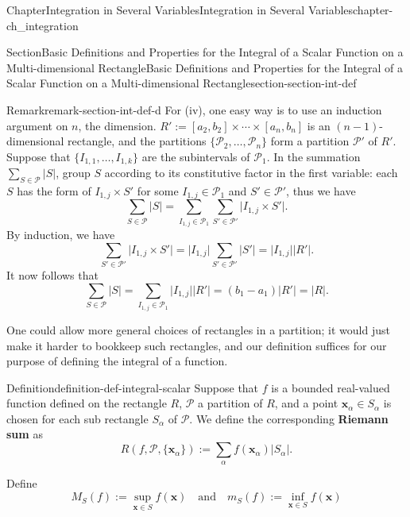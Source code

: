 \documentclass[oneside,10pt,]{book}
\newcommand{\terminology}[1]{\textbf{#1}}
\numberwithin{equation}{section}
\newcommand{\bx}{\mathbf{x}}
\newcommand{\cP}{\mathcal{P}}
\begin{document}
\begin{chapterptx}{Chapter}{Integration in Several Variables}{}{Integration in Several Variables}{}{}{chapter-ch_integration}
\begin{sectionptx}{Section}{Basic Definitions and Properties for the Integral of a Scalar Function on a Multi-dimensional Rectangle}{}{Basic Definitions and Properties for the Integral of a Scalar Function on a Multi-dimensional Rectangle}{}{}{section-section-int-def}
\begin{remark}{Remark}{}{remark-section-int-def-d}
For (iv), one easy way is to use an induction argument on \(n\), the dimension. \(R':=[a_{2}, b_{2}]\times \cdots \times [a_{n}, b_{n}]\) is an \((n-1)\)-dimensional rectangle, and the partitions \(\{\cP_{2},\ldots, \cP_{n}\}\) form a partition \(\cP'\) of \(R'\). Suppose that \(\{I_{1,1},\ldots, I_{1,k}\}\) are the subintervals of \(\cP_{1}\). In the summation \(\sum_{S\in \cP}\vert S\vert\), group \(S\) according to its constitutive factor in the first variable: each \(S\) has the form of \(I_{1,j}\times S'\) for some \(I_{1,j}\in \cP_{1}\) and \(S'\in \cP'\), thus we have%
\begin{equation*}
\sum_{S\in \cP}\vert S\vert=\sum_{I_{1,j}\in \cP_{1}}\sum_{S'\in \cP'}
\vert I_{1,j} \times S'\vert.
\end{equation*}
By induction, we have%
\begin{equation*}
\sum_{S'\in \cP'}
\vert I_{1,j} \times S'\vert= \vert I_{1,j}\vert \sum_{S'\in \cP'}
\vert  S'\vert= \vert I_{1,j}\vert \vert R'\vert.
\end{equation*}
It now follows that%
\begin{equation*}
\sum_{S\in \cP}\vert S\vert=\sum_{I_{1,j}\in \cP_{1}} \vert I_{1,j}\vert \vert R'\vert
=(b_{1}-a_{1})  \vert R'\vert=\vert R\vert.
\end{equation*}
%
\par
One could allow more general choices of rectangles in a partition; it would just make it harder to bookkeep such rectangles, and our definition suffices for our purpose of defining the integral of a function.%
\end{remark}
\begin{definition}{Definition}{}{definition-def-integral-scalar}%
%
%
%
%
\label{notation-def-integral-scalar-e}%
Suppose that \(f\) is a bounded real-valued function defined on the rectangle \(R\), \(\cP\) a partition of \(R\), and a point \(\bx_{\alpha}\in S_{\alpha}\) is chosen for each sub rectangle \(S_{\alpha}\) of \(\cP\). We define the corresponding \terminology{Riemann sum} as%
\begin{equation*}
R(f, \cP, \{\bx_{\alpha}\}):=\sum_{\alpha} f(\bx_{\alpha}) \vert S_{\alpha} \vert.
\end{equation*}
%
\par
Define%
\begin{equation*}
M_{S}(f):=\sup_{\bx\in S}f(\bx) \quad \text{and} \quad 
m_{S}(f):=\inf_{\bx\in S}f(\bx) 
\end{equation*}

\end{definition}
\end{sectionptx}
\end{chapterptx}
\end{document}
